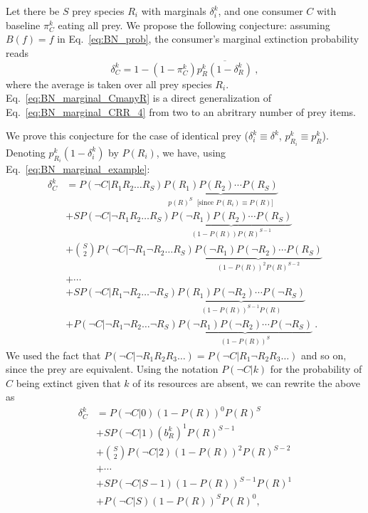 \documentclass[11pt]{article}
\newcommand{\ol}[1]{\overline{#1}}
\begin{document}
Let there be $S$ prey species $R_i$ with marginals $\delta_i^k$, and one consumer $C$ with baseline $\pi_C^k$ eating all prey. We propose the following conjecture: assuming $B(f)=f$ in Eq.~\ref{eq:BN_prob}, the consumer's marginal extinction probability reads
\begin{equation}
  \label{eq:BN_marginal_CmanyR}
  \delta_C^k = 1 - (1 - \pi_C^k) \ol{p_R^k (1 - \delta_R^k)} \ ,
\end{equation}
where the average is taken over all prey species $R_i$. Eq.~\ref{eq:BN_marginal_CmanyR} is a direct generalization of Eq.~\ref{eq:BN_marginal_CRR_4} from two to an abritrary number of prey items.

We prove this conjecture for the case of identical prey ($\delta_i^k \equiv \delta^k$, $p_{R_i}^k \equiv p_R^k$). Denoting $p_{R_i}^k (1 - \delta_i^k)$ by $P(R_i)$, we have, using Eq.~\ref{eq:BN_marginal_example}:
\begin{align}
  \label{eq:BN_marginal_twolayer}
    \delta_C^k &= P(\neg C|R_1 R_2 \ldots R_S) \underbrace{P(R_1)
      P(R_2) \cdots P(R_S)}_{p(R)^S \; \text{ [since $P(R_i) \equiv P(R)$]}}
    \nonumber \\ &+ S P(\neg C|\neg R_1 R_2 \ldots R_S)
    \underbrace{P(\neg R_1) P(R_2) \cdots P(R_S)}_{(1-P(R)) P(R)^{S-1}}
    \\ &+ \binom{S}{2} P(\neg C|\neg R_1 \neg R_2 \ldots R_S)
    \underbrace{P(\neg R_1) P(\neg R_2) \cdots P(R_S)}_{(1-P(R))^2 P(R)^{S-2}}
    \nonumber \\ &+ \cdots
    \nonumber \\ &+ S P(\neg C|R_1 \neg R_2 \ldots \neg R_S)
    \underbrace{P(R_1) P(\neg R_2) \cdots P(\neg R_S)}_{(1-P(R))^{S-1} P(R)}
    \nonumber \\ &+ P(\neg C|\neg R_1 \neg R_2 \ldots \neg R_S)
    \underbrace{P(\neg R_1) P(\neg R_2) \cdots P(\neg R_S)}_{(1-P(R))^{S}} \ .
                   \nonumber
\end{align}
We used the fact that $P(\neg C|\neg R_1 R_2 R_3 \ldots) = P(\neg C|R_1 \neg R_2 R_3 \ldots)$ and so on, since the prey are equivalent. Using the notation $P(\neg C|k)$ for the probability of $C$ being extinct given that $k$ of its resources are absent, we can rewrite the above as
\begin{equation}
  \label{eq:BN_marginal_twolayer_2}
  \begin{split}
    \delta_C^k &= P(\neg C|0) (1-P(R))^{0} P(R)^{S}
    \\ &+ S P(\neg C|1) (b_R^k)^{1} P(R)^{S-1}
    \\ &+ \binom{S}{2} P(\neg C|2) (1-P(R))^{2} P(R)^{S-2}
    \\ &+ \cdots
    \\ &+ S P(\neg C|S-1) (1-P(R))^{S-1} P(R)^{1}
    \\ &+ P(\neg C|S) (1-P(R))^{S} P(R)^{0} ,
  \end{split}
\end{equation}
\end{document}
